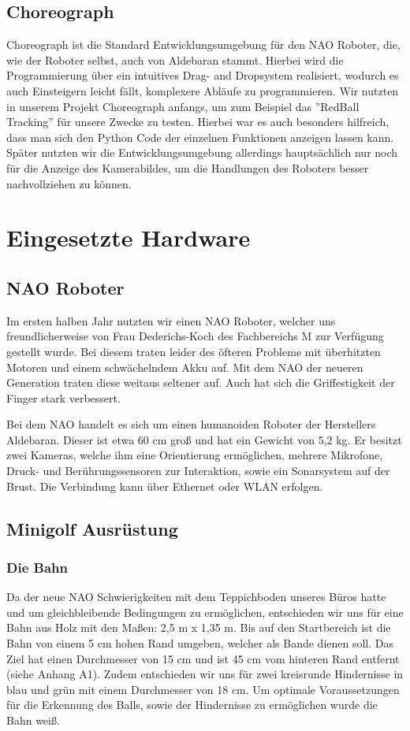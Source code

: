 \documentclass{scrartcl}
\begin{document}
\subsection{Choreograph}
Choreograph ist die Standard Entwicklungsumgebung für den NAO Roboter, die, wie der Roboter selbst, auch von Aldebaran stammt. Hierbei wird die Programmierung über ein intuitives Drag- and Dropsystem realisiert, wodurch es auch Einsteigern leicht fällt, komplexere Abläufe zu programmieren. Wir nutzten in unserem Projekt Choreograph anfangs, um zum Beispiel das ''RedBall Tracking'' für unsere Zwecke zu testen. Hierbei war es auch besonders hilfreich, dass man sich den Python Code der einzelnen Funktionen anzeigen lassen kann. Später nutzten wir die Entwicklungsumgebung allerdings hauptsächlich nur noch für die Anzeige des Kamerabildes, um die Handlungen des Roboters besser nachvollziehen zu können.

\section{Eingesetzte Hardware}

\subsection{NAO Roboter}
Im ersten halben Jahr nutzten wir einen NAO Roboter, welcher uns freundlicherweise von Frau Dederichs-Koch des Fachbereichs M zur Verfügung gestellt wurde. Bei diesem traten leider des öfteren Probleme mit überhitzten Motoren und einem schwächelndem Akku auf.  
Mit dem NAO der neueren Generation traten diese weitaus seltener auf. Auch hat sich die Griffestigkeit der Finger stark verbessert.

Bei dem NAO handelt es sich um einen humanoiden Roboter der Herstellers Aldebaran.
Dieser ist etwa 60 cm groß und hat ein Gewicht von 5,2 kg. Er besitzt zwei Kameras, welche ihm eine Orientierung ermöglichen,  mehrere Mikrofone, Druck- und Berührungssensoren zur Interaktion, sowie ein Sonarsystem auf der Brust. Die Verbindung kann über Ethernet oder WLAN erfolgen. 



\subsection{Minigolf Ausrüstung}

\subsubsection{Die Bahn}
Da der neue NAO Schwierigkeiten mit dem Teppichboden unseres Büros hatte und um gleichbleibende Bedingungen zu ermöglichen, entschieden wir uns für eine Bahn aus Holz mit den Maßen: 2,5 m x 1,35 m. Bis auf den Startbereich ist die Bahn von einem 5 cm hohen Rand umgeben, welcher als Bande dienen soll. Das Ziel hat einen Durchmesser von 15 cm und ist 45 cm vom hinteren Rand entfernt (siehe Anhang A1). Zudem entschieden wir uns für zwei kreisrunde Hindernisse in blau und grün mit einem Durchmesser von 18 cm. Um  optimale Voraussetzungen für die Erkennung des Balls, sowie der Hindernisse zu ermöglichen wurde die Bahn weiß.
\end{document}
